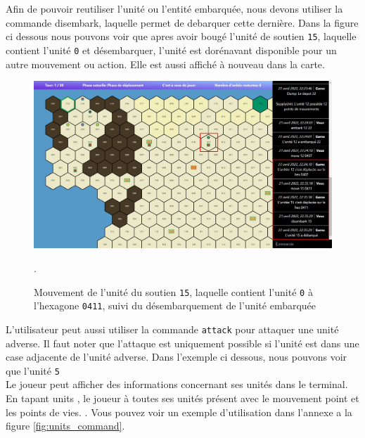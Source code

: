 Afin de pouvoir reutiliser l'unité ou l'entité embarquée, nous devons utiliser la commande disembark, laquelle permet de debarquer cette dernière.
Dans la figure ci dessous nous pouvons voir que apres avoir bougé l'unité de soutien {\tt 15}, laquelle contient l'unité {\tt 0} et désembarquer, l'unité est dorénavant disponible pour un autre mouvement ou action. Elle est aussi affiché à nouveau dans la carte.\\

\begin{figure}[H]
    \centering
    \includegraphics[scale=0.35]{data/Disembark.jpg}
    \caption{Mouvement de l'unité du soutien \lstinline{15}, laquelle contient l'unité \lstinline{0} à l'hexagone \lstinline{0411}, suivi du désembarquement de l'unité embarquée}.
\end{figure}

L'utilisateur peut aussi utiliser la commande {\tt attack} pour attaquer une unité adverse. Il faut noter que l'attaque est uniquement possible si l'unité est dans une case adjacente de l'unité adverse. Dans l'exemple ci dessous, nous pouvons voir que l'unité {\tt 5} \\

Le joueur peut afficher des informations concernant ses unités dans le terminal.
En tapant \og units \fg{}, le joueur à toutes ses unités présent avec le mouvement point et  les points de vies.
. Vous pouvez voir un exemple d'utilisation dans l'annexe a la figure \ref{fig:units_command}. \\




